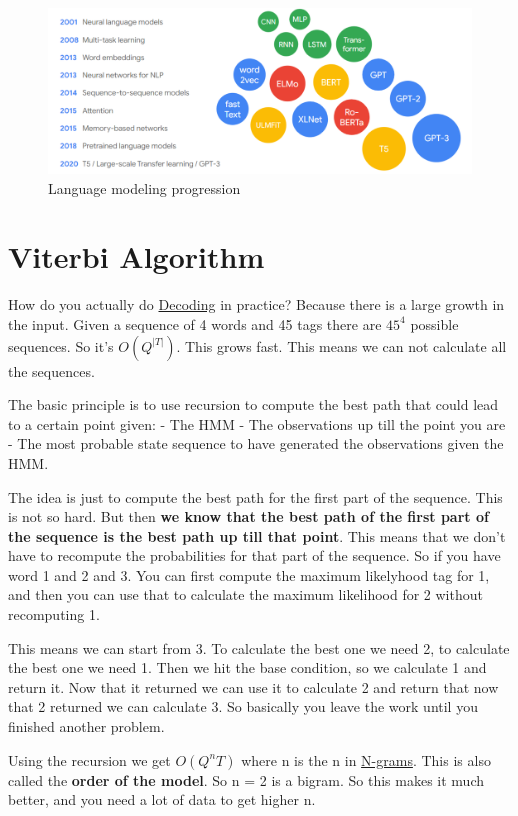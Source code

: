 \documentclass[
  11pt,
  british,
]{article}
\begin{document}
\begin{figure}
\centering
\includegraphics{Pasted_image_20220605011349.png}
\caption{Language modeling progression}
\end{figure}

\hypertarget{viterbi-algorithm}{%
\section{Viterbi Algorithm}\label{viterbi-algorithm}}

How do you actually do \href{Decoding.md}{Decoding} in practice? Because
there is a large growth in the input. Given a sequence of 4 words and 45
tags there are \(45^4\) possible sequences. So it's \(O(Q^{|T|})\). This
grows fast. This means we can not calculate all the sequences.

The basic principle is to use recursion to compute the best path that
could lead to a certain point given: - The HMM - The observations up
till the point you are - The most probable state sequence to have
generated the observations given the HMM.

The idea is just to compute the best path for the first part of the
sequence. This is not so hard. But then \textbf{we know that the best
path of the first part of the sequence is the best path up till that
point}. This means that we don't have to recompute the probabilities for
that part of the sequence. So if you have word 1 and 2 and 3. You can
first compute the maximum likelyhood tag for 1, and then you can use
that to calculate the maximum likelihood for 2 without recomputing 1.

This means we can start from 3. To calculate the best one we need 2, to
calculate the best one we need 1. Then we hit the base condition, so we
calculate 1 and return it. Now that it returned we can use it to
calculate 2 and return that now that 2 returned we can calculate 3. So
basically you leave the work until you finished another problem.

Using the recursion we get \(O(Q^nT)\) where n is the n in
\href{../Languages/N-grams.md}{N-grams}. This is also called the
\textbf{order of the model}. So n = 2 is a bigram. So this makes it much
better, and you need a lot of data to get higher n.~
\end{document}
